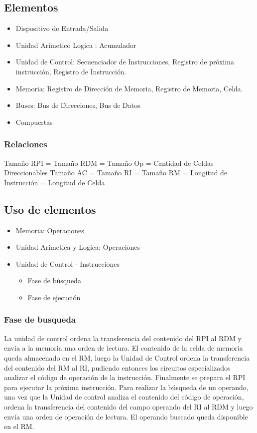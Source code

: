 \subsection{Elementos}
\begin{itemize}
\item Dispositivo de Entrada/Salida
\item Unidad Arimetico Logica : Acumulador
\item Unidad de Control: Secuenciador de Instrucciones, Registro de próxima instrucción, Registro de Instrucción.
\item Memoria: Registro de Dirección de Memoria, Registro de Memoria, Celda.
\item Buses: Bus de Direcciones, Bus de Datos
\item Compuertas
\end{itemize}

\subsubsection{Relaciones}
Tamaño RPI = Tamaño RDM = Tamaño Op = Cantidad de Celdas Direccionables
Tamaño AC = Tamaño RI = Tamaño RM = Longitud de Instrucción = Longitud de Celda

\subsection{Uso de elementos}
\begin{itemize}
\item Memoria: Operaciones
\item Unidad Arimetica y Logica: Operaciones
\item Unidad de Control - Instrucciones
	\begin{itemize}
	\item Fase de búsqueda
	\item Fase de ejecución
	\end{itemize}
\end{itemize}

\subsubsection{Fase de busqueda}
La unidad de control ordena la transferencia del contenido del RPI al RDM y envía a la memoria una orden de lectura. El contenido de la celda de memoria queda almacenado en el RM, luego la Unidad de Control ordena la transferencia del contenido del RM al RI, pudiendo entonces los circuitos especializados analizar el código de operación de la instrucción. Finalmente se prepara el RPI para ejecutar la próxima instrucción.
Para realizar la búsqueda de un operando, una vez que la Unidad de control analiza el contenido del código de operación, ordena la transferencia del contenido del campo operando del RI al RDM y luego envía una orden de operación de lectura. El operando buscado queda disponible en el RM.

